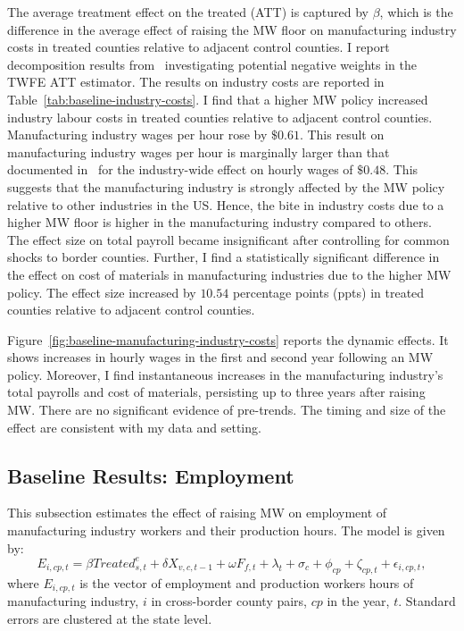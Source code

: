 \documentclass[12pt, english]{article}
\begin{document}
    The average treatment effect on the treated (ATT) is captured by $\beta$, which is the difference in the average effect of raising the MW floor on manufacturing industry costs in treated counties relative to adjacent control counties. I report decomposition results from~\cite{de2020two} investigating potential negative weights in the TWFE ATT estimator. The results on industry costs are reported in Table~\ref{tab:baseline-industry-costs}. I find that a higher MW policy increased industry labour costs in treated counties relative to adjacent control counties. Manufacturing industry wages per hour rose by $\$0.61$. This result on manufacturing industry wages per hour is marginally larger than that documented in~\cite{gopalan2021state} for the industry-wide effect on hourly wages of $\$0.48$. This suggests that the manufacturing industry is strongly affected by the MW policy relative to other industries in the US. Hence, the bite in industry costs due to a higher MW floor is higher in the manufacturing industry compared to others. The effect size on total payroll became insignificant after controlling for common shocks to border counties. Further, I find a statistically significant difference in the effect on cost of materials in manufacturing industries due to the higher MW policy. The effect size increased by $10.54$ percentage points (ppts) in treated counties relative to adjacent control counties.
    

    Figure~\ref{fig:baseline-manufacturing-industry-costs} reports the dynamic effects. It shows increases in hourly wages in the first and second year following an MW policy. Moreover, I find instantaneous increases in the manufacturing industry's total payrolls and cost of materials, persisting up to three years after raising MW. There are no significant evidence of pre-trends. The timing and size of the effect are consistent with my data and setting.

    \subsection{Baseline Results: Employment}\label{subsec:baseline-results-employment}
    This subsection estimates the effect of raising MW on employment of manufacturing industry workers and their production hours. The model is given by:
    \begin{equation}
        E_{i,cp,t} = \beta Treated_{s,t}^e + \delta X_{v,c,t-1} + \omega F_{f,t} + \lambda_{t} + \sigma_{c} + \phi_{cp} + \zeta_{cp,t} + \epsilon_{i,cp,t},\label{eq:baseline-emp-hours}
    \end{equation}
    where $E_{i,cp,t}$ is the vector of employment and production workers hours of manufacturing industry, $i$ in cross-border county pairs, $cp$ in the year, $t$. Standard errors are clustered at the state level.
    
\end{document}
